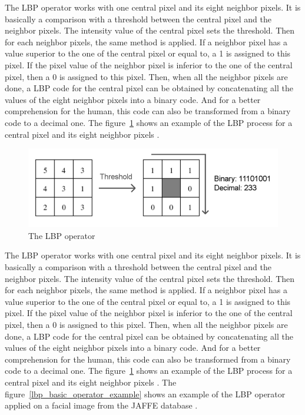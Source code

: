 \noindent The LBP operator works with one central pixel and its eight neighbor pixels. It is basically a comparison with a threshold between the central pixel and the neighbor pixels. The intensity value of the central pixel sets the threshold. Then for each neighbor pixels, the same method is applied. If a neighbor pixel has a value superior to the one of the central pixel or equal to, a 1 is assigned to this pixel. If the pixel value of the neighbor pixel is inferior to the one of the central pixel, then a 0 is assigned to this pixel. Then, when all the neighbor pixels are done, a LBP code for the central pixel can be obtained by concatenating all the values of the eight neighbor pixels into a binary code. And for a better comprehension for the human, this code can also be transformed from a binary code to a decimal one. The figure~\ref{lbp_basic_operator} shows an example of the LBP process for a central pixel and its eight neighbor pixels \cite{JUL07}.
\newline

\begin{figure}[!h]
\begin{center}
\noindent \includegraphics[scale=0.5]{figures/lbp_basic_operator} 
\newline
\caption{The LBP operator}
\label{lbp_basic_operator}
\end{center} 
\end{figure}

\noindent The LBP operator works with one central pixel and its eight neighbor pixels. It is basically a comparison with a threshold between the central pixel and the neighbor pixels. The intensity value of the central pixel sets the threshold. Then for each neighbor pixels, the same method is applied. If a neighbor pixel has a value superior to the one of the central pixel or equal to, a 1 is assigned to this pixel. If the pixel value of the neighbor pixel is inferior to the one of the central pixel, then a 0 is assigned to this pixel. Then, when all the neighbor pixels are done, a LBP code for the central pixel can be obtained by concatenating all the values of the eight neighbor pixels into a binary code. And for a better comprehension for the human, this code can also be transformed from a binary code to a decimal one. The figure~\ref{lbp_basic_operator} shows an example of the LBP process for a central pixel and its eight neighbor pixels \cite{JUL07}. The figure~\ref{lbp_basic_operator_example} shows an example of the LBP operator applied on a facial image from the JAFFE database \cite{LIU11}.
\newline

